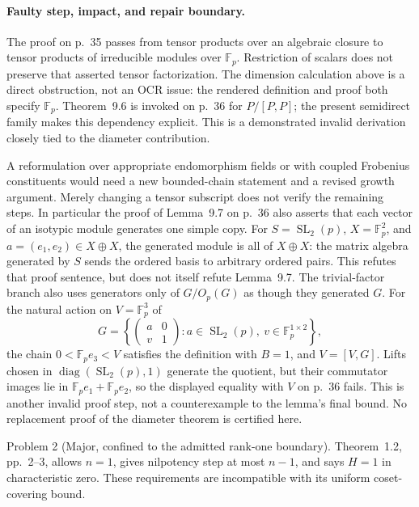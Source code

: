 \documentclass[10pt]{article}
\begin{document}
\paragraph*{Faulty step, impact, and repair boundary.}\mbox{}\par
The proof on p. 35 passes from tensor products over an algebraic closure to tensor products of irreducible modules over \(\mathbb F_p\). Restriction of scalars does not preserve that asserted tensor factorization. The dimension calculation above is a direct obstruction, not an OCR issue: the rendered definition and proof both specify \(\mathbb F_p\). Theorem 9.6 is invoked on p. 36 for \(P/[P,P]\); the present semidirect family makes this dependency explicit. This is a demonstrated invalid derivation closely tied to the diameter contribution.\par
A reformulation over appropriate endomorphism fields or with coupled Frobenius constituents would need a new bounded-chain statement and a revised growth argument. Merely changing a tensor subscript does not verify the remaining steps. In particular the proof of Lemma 9.7 on p. 36 also asserts that each vector of an isotypic module generates one simple copy. For \(S=\operatorname{SL}_2(p)\), \(X=\mathbb F_p^2\), and \(a=(e_1,e_2)\in X\oplus X\), the generated module is all of \(X\oplus X\): the matrix algebra generated by \(S\) sends the ordered basis to arbitrary ordered pairs. This refutes that proof sentence, but does not itself refute Lemma 9.7. The trivial-factor branch also uses generators only of \(G/O_p(G)\) as though they generated \(G\). For the natural action on \(V=\mathbb F_p^3\) of \[G=\left\{\begin{pmatrix}a&0\\v&1\end{pmatrix}:a\in\operatorname{SL}_2(p),\
 v\in\mathbb F_p^{1\times2}\right\},\] the chain \(0<\mathbb F_pe_3<V\) satisfies the definition with \(B=1\), and \(V=[V,G]\). Lifts chosen in \(\operatorname{diag}(\operatorname{SL}_2(p),1)\) generate the quotient, but their commutator images lie in \(\mathbb F_pe_1+\mathbb F_pe_2\), so the displayed equality with \(V\) on p. 36 fails. This is another invalid proof step, not a counterexample to the lemma’s final bound. No replacement proof of the diameter theorem is certified here.\par
Problem 2 (Major, confined to the admitted rank-one boundary).  Theorem 1.2, pp. 2–3, allows \(n=1\), gives nilpotency step at most \(n-1\), and says \(H=1\) in characteristic zero. These requirements are incompatible with its uniform coset-covering bound.\par
\end{document}
